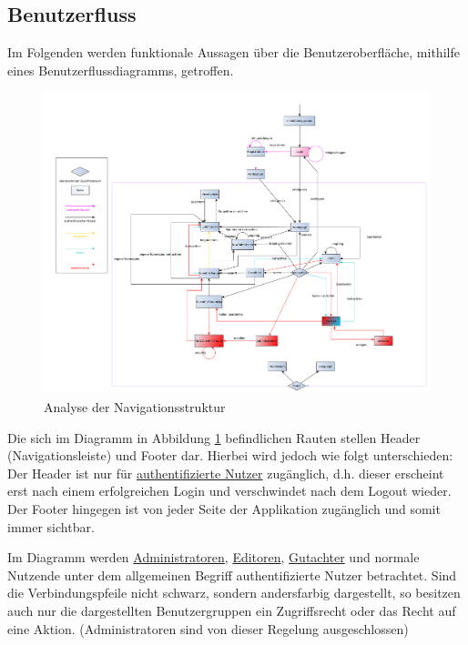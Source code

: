 \subsection{Benutzerfluss}
Im Folgenden werden funktionale Aussagen über die Benutzeroberfläche, mithilfe eines Benutzerflussdiagramms, getroffen.

\begin{figure}[H]
	\centering
	\includegraphics[width=\linewidth]{graphics/benutzerFlussyEd}
	\caption{Analyse der Navigationsstruktur}
	\label{fig:benutzerfluss}
\end{figure}

Die sich im Diagramm in Abbildung \ref{fig:benutzerfluss} befindlichen Rauten stellen Header (Navigationsleiste) und Footer dar.
Hierbei wird jedoch wie folgt unterschieden: Der Header ist nur für \hyperref[glo:regnutzer]{authentifizierte Nutzer} zugänglich,
d.h. dieser erscheint erst nach einem erfolgreichen Login und verschwindet nach dem Logout wieder.
Der Footer hingegen ist von jeder Seite der Applikation zugänglich und somit immer sichtbar.

Im Diagramm werden \hyperref[glo:admin]{Administratoren}, \hyperref[glo:editor]{Editoren}, \hyperref[glo:gutachter]{Gutachter} und normale Nutzende unter dem allgemeinen Begriff
authentifizierte Nutzer betrachtet.
Sind die Verbindungspfeile nicht schwarz, sondern andersfarbig dargestellt, so besitzen auch nur die
dargestellten Benutzergruppen ein Zugriffsrecht oder das Recht auf eine Aktion. (Administratoren sind von dieser Regelung
ausgeschlossen)

